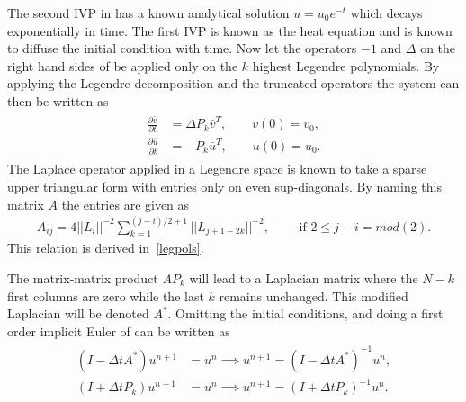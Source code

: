 The second IVP in  has a known analytical solution 
$u = u_0e^{-t}$ which decays exponentially in time. The first IVP is known 
as the heat equation and is known to diffuse the initial condition with time. 
Now let the operators $-1$ and $\Delta$ on the right hand sides of 
be applied only on the $k$ highest Legendre polynomials. By applying the Legendre decomposition
and the truncated operators the system can then be written as 
%
\begin{align}
    \begin{split}
    \frac{\partial \bar v }{\partial t}
    &= \Delta P_{k}\bar v^T , \qquad v(0) = v_0, \\
        \frac{\partial \bar u }{\partial t} 
        &=   -P_{k}\bar u^T , \qquad u(0) = u_0.
    \label{eq:ivps2}
    \end{split}
\end{align}
%
The Laplace operator applied in a Legendre space is known to take a sparse upper triangular form
with entries only on even sup-diagonals. By naming this matrix $A$ the entries are given as 
%
\begin{align}
    A_{ij} = 4||L_i||^{-2} \sum_{k=1}^{(j-i)/2+1} ||L_{j+1-2k}||^{-2}, \qquad \text{ if } 2 \le j-i = mod(2). 
    \label{Laplace-entries}
\end{align}
%
This relation is derived in~\ref{legpols}.

The matrix-matrix product $AP_{k}$ will lead to a Laplacian matrix where the $N-k$ first columns are zero
while the last $k$ remains unchanged. This modified Laplacian will be denoted $A^*$.
Omitting the initial conditions, and doing a first order implicit 
Euler of  can be written as 
%
\begin{align}
    \begin{split}
    (I-\Delta t A^*)u^{n+1} &= u^n  \implies u^{n+1}= (I-\Delta t A^*)^{-1}u^{n}, \\
    (I+\Delta t P_{k})u^{n+1} &= u^n \implies u^{n+1} = (I+\Delta t P_{k})^{-1}u^{n}.
    \label{eq:timestep}
    \end{split}
\end{align}
%


